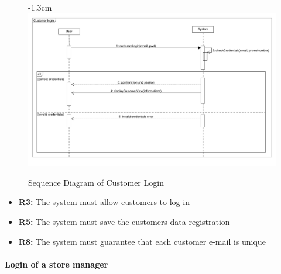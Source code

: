 \documentclass{article}
\begin{document}
\begin{center}
\begin{adjustwidth}{-2.8cm}{}
\begin{tabular}[h!]{|m{7.5em}|m{36em}|}
					\end{tabular}
					\end{adjustwidth}
					
					\begin{figure}[!h]
						\begin{adjustwidth} {-1.3cm}{}
							\centering
							\includegraphics[scale=0.36]{SD/3_customerLogin.pdf}\\
							\caption{Sequence Diagram of Customer Login}
						\end{adjustwidth}
					\end{figure}

					\begin{itemize}
					\bigskip
					\bigskip
					\bigskip
					 {\bfseries Required functional requirements: }
					\item {\bfseries R3: } The system must allow customers to log in
					\item {\bfseries R5: } The system must save the customers data registration
					\item {\bfseries R8: } The system must guarantee that each customer e-mail is unique

					\end{itemize}

				\end{center}
			
					\bigskip
					\bigskip
					\bigskip
			\paragraph{Login of a store manager}
			
\end{document}
